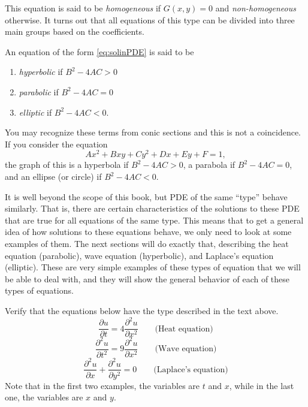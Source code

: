 \documentclass{ximera}
\begin{document}
This equation is said to be \emph{homogeneous} if $G(x,y) = 0$ and \emph{non-homogeneous} otherwise. It turns out that all equations of this type can be divided into three main groups based on the coefficients.

\begin{definition}
    An equation of the form \eqref{eq:solinPDE} is said to be
    \begin{enumerate}
        \item \emph{hyperbolic} if $B^2 - 4AC > 0$
        \item \emph{parabolic} if $B^2 - 4AC = 0$
        \item \emph{elliptic} if $B^2 - 4AC < 0$.
    \end{enumerate}
\end{definition}

\begin{remark}
    You may recognize these terms from conic sections and this is not a coincidence. If you consider the equation
    \[ 
        Ax^2 + Bxy + Cy^2 + Dx + Ey + F = 1, 
    \] 
    the graph of this is a hyperbola if $B^2 - 4AC > 0$, a parabola if $B^2 - 4AC = 0$, and an ellipse (or circle) if $B^2 - 4AC < 0$.
\end{remark}

It is well beyond the scope of this book, but PDE of the same ``type'' behave similarly. That is, there are certain characteristics  of the solutions to these PDE that are true for all equations of the same type. This means that to get a general idea of how solutions to these equations behave, we only need to look at some examples of them. The next sections will do exactly that, describing the heat equation (parabolic), wave equation (hyperbolic), and Laplace's equation (elliptic). These are very simple examples of these types of equation that we will be able to deal with, and they will show the general behavior of each of these types of equations. 

\begin{exercise}
    Verify that the equations below have the type described in the text above.
    \[ 
        \frac{\partial u}{\partial t} = 4 \frac{\partial^2 u}{\partial x^2} \qquad \text{(Heat equation)} 
    \]
    \[ 
        \frac{\partial^2 u}{\partial t^2} = 9 \frac{\partial^2 u}{\partial x^2} \qquad \text{(Wave equation)} 
    \]
    \[ 
        \frac{\partial^2 u}{\partial x} + \frac{\partial^2 u}{\partial y^2} = 0 \qquad \text{(Laplace's equation)} 
    \]
    Note that in the first two examples, the variables are $t$ and $x$, while in the last one, the variables are $x$ and $y$. 
\end{exercise}
\end{document}
